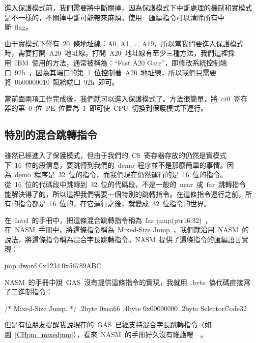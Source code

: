 進入保護模式前，我們需要將中斷關掉，因為保護模式下中斷處理的機制和實模式是不一樣的，不關掉中斷可能帶來麻煩。使用~~匯編指令可以清除所有中斷~flag。

由于實模式下僅有~20~條地址線：A0, A1, \ldots, A19，所以當我們要進入保護模式時，需要打開~A20~地址線。打開~A20~地址線有至少三種方法，我們這裡採用~IBM~使用的方法，通常被稱為：“Fast A20 Gate”，即修改系統控制端口~92h~，因為其端口的第~1~位控制著~A20~地址線，所以我們只需要將~0b00000010~賦給端口~92h~即可。

當前面兩項工作完成後，我們就可以進入保護模式了。方法很簡單，將~cr0~寄存器的第~0~位~PE~位置為~1~即可使~CPU~切換到保護模式下運行。

\label{CHpm_enablepm}

\subsection{特別的混合跳轉指令}

雖然已經進入了保護模式，但由于我們的~CS~寄存器存放的仍然是實模式下~16~位的段信息，要跳轉到我們的~demo~程序並不是那麼簡單的事情。因為~demo~程序是~32~位的指令，而我們現在仍然運行的是~16~位的指令。從~16~位的代碼段中跳轉到~32~位的代碼段，不是一般的~near~或~far~跳轉指令能解決得了的，所以這裡我們需要一個特別的跳轉指令。在這條指令運行之前，所有的指令都是~16~位的，在它運行之後，就變成~32~位指令的世界。

在~Intel~的手冊中，把這條混合跳轉指令稱為~far jump(ptr16:32)~，在~NASM~手冊中，將這條指令稱為~Mixed-Size Jump~，我們就沿用~NASM~的說法，將這條指令稱為混合字長跳轉指令。NASM~提供了這條指令的匯編語言實現：
\begin{Command}
jmp dword 0x1234:0x56789ABC
\end{Command}
NASM~的手冊中說~GAS~沒有提供這條指令的實現，我就用~.byte~偽代碼直接寫了二進制指令：
\begin{Command}
/* Mixed-Size Jump. */
.2byte  0xea66
.4byte  0x00000000
.2byte  SelectorCode32
\end{Command}
但是有位朋友提醒我說現在的~GAS~已經支持混合字長跳轉指令（如圖~\ref{CHpm_mixedjmp}），看來~NASM~的手冊好久沒有維護嘍~\smiley~。

\label{CHpm_mixedjmp}

